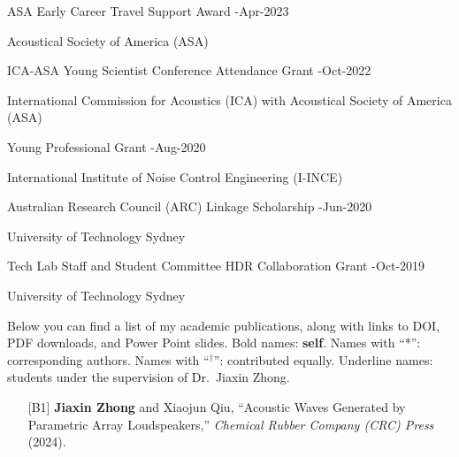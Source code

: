 \documentclass[10pt,a4paper,ragged2e,withhyper]{altacv}
\newcommand{\PubMe}[1]{\textbf{#1}}
\begin{document}
{\color{accent}ASA Early Career Travel Support Award}  %
\hfill {}-Apr-2023
\par
Acoustical Society of America (ASA)

\divider

{\color{accent}ICA-ASA Young Scientist Conference Attendance Grant}
\hfill {}-Oct-2022
\par
International Commission for
Acoustics (ICA) with Acoustical Society of America (ASA)

\divider

{\color{accent}Young Professional Grant}
\hfill {}-Aug-2020
\par
International Institute of Noise Control Engineering (I-INCE)

\divider

{\color{accent}Australian Research Council (ARC) Linkage Scholarship}
\hfill {}-Jun-2020
\par
University of Technology Sydney

\divider

{\color{accent}Tech Lab Staff and Student Committee HDR Collaboration Grant}
\hfill {}-Oct-2019
\par
University of Technology Sydney


\newpage
{}

Below you can find a list of my academic publications, along with links to {\color{accent}\aiDoi} DOI, {\color{accent}\faFilePdf[regular]} PDF downloads, and {\color{accent}\faFilePowerpoint[regular]} Power Point slides.
Bold names: \textbf{self}.
Names with ``*'': corresponding authors.
Names with ``${}^\dag$'': contributed equally.
Underline names: students under the supervision of Dr.\ Jiaxin Zhong.

\vspace{.5cm}


\begin{itemize}[leftmargin = 25pt]
    \justifying
    \item[{[B1]}] \PubMe{Jiaxin Zhong} and Xiaojun Qiu,
    ``Acoustic Waves Generated by Parametric Array Loudspeakers,''
    \textit{Chemical Rubber Company (CRC) Press} (2024).
    \href{https://doi.org/10.1201/9781003354994}{\color{accent}\aiDoi}
\end{itemize}

\divider
\end{document}
